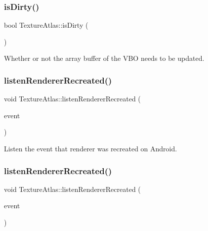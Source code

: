 \subsubsection{\texorpdfstring{is\+Dirty()}{isDirty()}\hspace{0.1cm}{\footnotesize\ttfamily [2/2]}}
{\footnotesize\ttfamily bool Texture\+Atlas\+::is\+Dirty (\begin{DoxyParamCaption}\item[{void}]{ }\end{DoxyParamCaption})\hspace{0.3cm}{\ttfamily [inline]}}

Whether or not the array buffer of the V\+BO needs to be updated. \mbox{\label{classTextureAtlas_a1ae9b2e2ee16ce31e44171fc248f76a4}} 
\subsubsection{\texorpdfstring{listen\+Renderer\+Recreated()}{listenRendererRecreated()}\hspace{0.1cm}{\footnotesize\ttfamily [1/2]}}
{\footnotesize\ttfamily void Texture\+Atlas\+::listen\+Renderer\+Recreated (\begin{DoxyParamCaption}\item[{\hyperlink{classEventCustom}{Event\+Custom} $\ast$}]{event }\end{DoxyParamCaption})}

Listen the event that renderer was recreated on Android. \mbox{\label{classTextureAtlas_a1ae9b2e2ee16ce31e44171fc248f76a4}} 
\subsubsection{\texorpdfstring{listen\+Renderer\+Recreated()}{listenRendererRecreated()}\hspace{0.1cm}{\footnotesize\ttfamily [2/2]}}
{\footnotesize\ttfamily void Texture\+Atlas\+::listen\+Renderer\+Recreated (\begin{DoxyParamCaption}\item[{\hyperlink{classEventCustom}{Event\+Custom} $\ast$}]{event }\end{DoxyParamCaption})}

